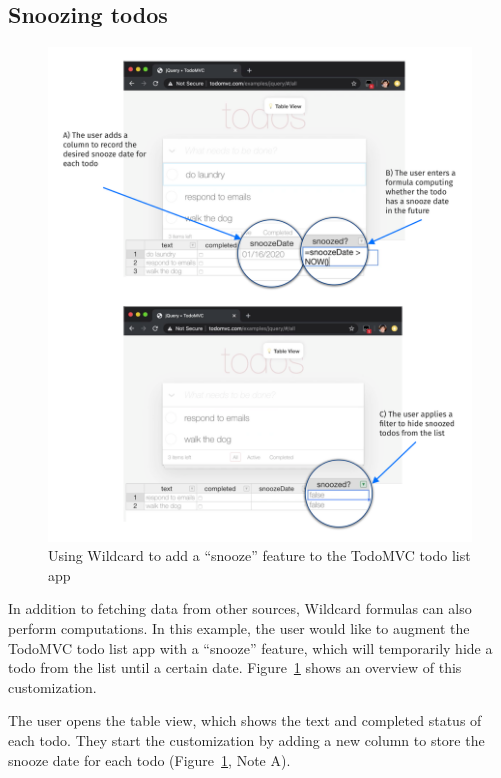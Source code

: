 \documentclass[english,submission]{programming}
\begin{document}
\hypertarget{snoozing-todos}{%
\subsection{Snoozing todos}\label{snoozing-todos}}

\begin{figure}
\hypertarget{fig:todomvc-demo}{%
\centering
\includegraphics{media/todomvc-demo-300dpi.png}
\caption{Using Wildcard to add a ``snooze'' feature to the TodoMVC todo
list app}\label{fig:todomvc-demo}
}
\end{figure}

In addition to fetching data from other sources, Wildcard formulas can
also perform computations. In this example, the user would like to
augment the TodoMVC todo list app with a ``snooze'' feature, which will
temporarily hide a todo from the list until a certain date.{
Figure~\ref{fig:todomvc-demo} shows an overview of this customization.}

The user opens the table view, which shows the text and completed status
of each todo. They start the customization by adding a new column to
store the snooze date for each todo{ (Figure~\ref{fig:todomvc-demo},
Note A)}.
\end{document}
